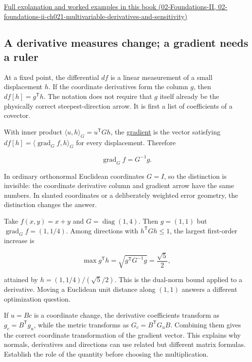 \href{../02-Foundations-II/main.pdf\#nameddest=02-foundations-ii-ch021-multivariable-derivatives-and-sensitivity}{Full explanation and worked examples in this book (02-Foundations-II, 02-foundations-ii-ch021-multivariable-derivatives-and-sensitivity)}

\subsection{A derivative measures change; a gradient needs a ruler}\label{01-foundations-i-ch018-a-derivative-measures-change-a-gradient-needs-a-ruler}

At a fixed point, the differential \(df\) is a linear measurement of a small displacement \(h\). If the coordinate derivatives form the column \(g\), then \(df[h]=g^{\mathsf T}h\). The notation does not require that \(g\) itself already be the physically correct steepest-direction arrow. It is first a list of coefficients of a covector.

With inner product \(\langle u,h\rangle_G=u^{\mathsf T}Gh\), the \hyperref[appendix-f4acdb1d5563]{gradient} is the vector satisfying \(df[h]=\langle\operatorname{grad}_G f,h\rangle_G\) for every displacement. Therefore

\[
\operatorname{grad}_G f=G^{-1}g.
\]

In ordinary orthonormal Euclidean coordinates \(G=I\), so the distinction is invisible: the coordinate derivative column and gradient arrow have the same numbers. In slanted coordinates or a deliberately weighted error geometry, the distinction changes the answer.

Take \(f(x,y)=x+y\) and \(G=\operatorname{diag}(1,4)\). Then \(g=(1,1)\) but \(\operatorname{grad}_Gf=(1,1/4)\). Among directions with \(h^{\mathsf T}Gh\le1\), the largest first-order increase is

\[
\max g^{\mathsf T}h=\sqrt{g^{\mathsf T}G^{-1}g}=\frac{\sqrt5}{2},
\]

attained by \(h=(1,1/4)/(\sqrt5/2)\). This is the dual-norm bound applied to a derivative. Moving a Euclidean unit distance along \((1,1)\) answers a different optimization question.

If \(u=Bc\) is a coordinate change, the derivative coefficients transform as \(g_c=B^{\mathsf T}g_u\), while the metric transforms as \(G_c=B^{\mathsf T}G_uB\). Combining them gives the correct coordinate transformation of the gradient vector. This explains why normals, derivatives and directions can use related but different matrix formulas. Establish the role of the quantity before choosing the multiplication.

